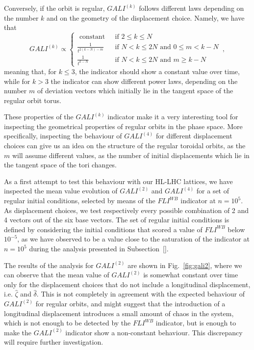 Conversely, if the orbit is regular, $GALI^{(k)}$ follows different laws depending on the number $k$ and on the geometry of the displacement choice. Namely, we have that
\begin{equation}
    GALI^{(k)} \propto \begin{cases}\text { constant } & \text { if } 2 \leq k \leq N \\ \frac{1}{t^{2(k-N)-m}} & \text { if } N<k \leq 2 N \text { and } 0 \leq m<k-N \\ \frac{1}{t^{k-N}} & \text { if } N<k \leq 2 N \text { and } m \geq k-N\end{cases} \,,
\end{equation}
meaning that, for $k\leq3$, the indicator should show a constant value over time, while for $k>3$ the indicator can show different power laws, depending on the number $m$ of deviation vectors which initially lie in the tangent space of the regular orbit torus.

These properties of the $GALI^{(k)}$ indicator make it a very interesting tool for inspecting the geometrical properties of regular orbits in the phase space. More specifically, inspecting the behaviour of $GALI^{(4)}$ for different displacement choices can give us an idea on the structure of the regular toroidal orbits, as the $m$ will assume different values, as the number of initial displacements which lie in the tangent space of the tori changes.

As a first attempt to test this behaviour with our HL-LHC lattices, we have inspected the mean value evolution of $GALI^{(2)}$ and $GALI^{(4)}$ for a set of regular initial conditions, selected by means of the $FLI^{WB}$ indicator at $n=10^5$. As displacement choices, we test respectively every possible combination of 2 and 4 vectors out of the six base vectors. The set of regular initial conditions is defined by considering the initial conditions that scored a value of $FLI^{WB}$ below $10^{-5}$, as we have observed to be a value close to the saturation of the indicator at $n=10^5$ during the analysis presented in Subsection~\ref{}.

The results of the analysis for $GALI^{(2)}$ are shown in Fig.~\ref{fig:gali2}, where we can observe that the mean value of $GALI^{(2)}$ is somewhat constant over time only for the displacement choices that do not include a longitudinal displacement, i.e. $\hat{\zeta}$ and $\hat{\delta}$. This is not completely in agreement with the expected behaviour of $GALI^{(2)}$ for regular orbits, and might suggest that the introduction of a longitudinal displacement introduces a small amount of chaos in the system, which is not enough to be detected by the $FLI^{WB}$ indicator, but is enough to make the $GALI^{(2)}$ indicator show a non-constant behaviour. This discrepancy will require further investigation.

